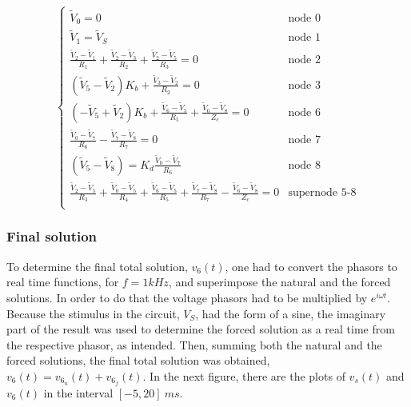 \begin{equation}
  \begin{cases}
  \tilde{V}_0 = 0 & \mbox{node 0} \\
   \tilde{V}_1 = \tilde{V}_S & \mbox{node 1} \\
  \frac{\tilde{V}_2-\tilde{V}_1}{R_1}+\frac{\tilde{V}_2-\tilde{V}_3}{R_2}+\frac{\tilde{V}_2-\tilde{V}_5}{R_3} = 0 & \mbox{node 2} \\
  (\tilde{V}_5-\tilde{V}_2)K_b + \frac{\tilde{V}_3-\tilde{V}_2}{R_2} = 0 & \mbox{node 3} \\
  (-\tilde{V}_5+\tilde{V}_2)K_b + \frac{\tilde{V}_6-\tilde{V}_5}{R_5} + \frac{\tilde{V}_6-\tilde{V}_8}{Z_c} = 0 & \mbox{node 6} \\
  \frac{\tilde{V}_0-\tilde{V}_7}{R_6} - \frac{\tilde{V}_7-\tilde{V}_8}{R_7} = 0 & \mbox{node 7} \\
  (\tilde{V}_5-\tilde{V}_8) = K_d \frac{\tilde{V}_0-\tilde{V}_7}{R_6} & \mbox{node 8} \\
  \frac{\tilde{V}_2-\tilde{V}_5}{R_3} + \frac{\tilde{V}_0-\tilde{V}_5}{R_4} + \frac{\tilde{V}_6-\tilde{V}_5}{R_5} + \frac{\tilde{V}_7-\tilde{V}_8}{R_7} - \frac{\tilde{V}_6-\tilde{V}_8}{Z_c} = 0 & \mbox{supernode 5-8} \\ 
  \end{cases}
\end{equation}








\subsubsection{Final solution}  %
To determine the final total solution, $v_6(t)$, one had to convert the phasors to real time functions, for $f=1kHz$, and superimpose the natural and the forced solutions.
In order to do that the voltage phasors had to be multiplied by $e^{i \omega t}$. Because the stimulus in the circuit, $V_S$, had the form of a sine, the imaginary part of the result was used to determine the forced solution as a real time from the respective phasor, as intended.
Then, summing both the natural and the forced solutions, the final total solution was obtained, $v_6(t) = v_{6_n} (t) + v_{6_f} (t)$.
In the next figure, there are the plots of $v_s(t)$ and $v_6(t)$ in the interval $[-5, 20] \ ms$.

